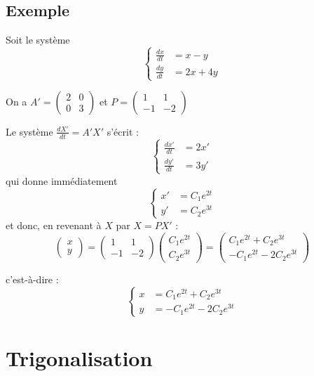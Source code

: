 \subsection*{Exemple}

Soit le système
\[
\left\{
\begin{aligned}
\frac{dx}{dt} &= x - y \\
\frac{dy}{dt} &= 2x + 4y
\end{aligned}
\right.
\]

On a \( A' = \begin{pmatrix} 2 & 0 \\ 0 & 3 \end{pmatrix} \) et 
\( P = \begin{pmatrix} 1 & 1 \\ -1 & -2 \end{pmatrix} \)

Le système \( \frac{dX'}{dt} = A'X' \) s’écrit :
\[
\left\{
\begin{aligned}
\frac{dx'}{dt} &= 2x' \\
\frac{dy'}{dt} &= 3y'
\end{aligned}
\right.
\]
qui donne immédiatement 
\[
\left\{
\begin{aligned}
x' &= C_1 e^{2t} \\
y' &= C_2 e^{3t}
\end{aligned}
\right.
\]
et donc, en revenant à \( X \) par \( X = PX' \) :
\[
\begin{pmatrix}
x \\
y
\end{pmatrix}
=
\begin{pmatrix}
1 & 1 \\
-1 & -2
\end{pmatrix}
\begin{pmatrix}
C_1 e^{2t} \\
C_2 e^{3t}
\end{pmatrix}
=
\begin{pmatrix}
C_1 e^{2t} + C_2 e^{3t} \\
- C_1 e^{2t} - 2C_2 e^{3t}
\end{pmatrix}
\]

c’est-à-dire :
\[
\left\{
\begin{aligned}
x &= C_1 e^{2t} + C_2 e^{3t} \\
y &= -C_1 e^{2t} - 2C_2 e^{3t}
\end{aligned}
\right.
\]

\section{Trigonalisation}


